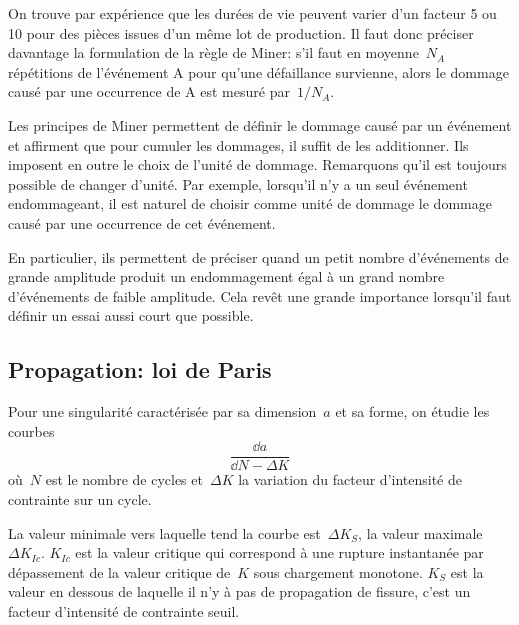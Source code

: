 On trouve par expérience que les durées de vie peuvent varier d'un facteur 5 ou 10 pour des pièces issues d'un même lot de production. Il faut donc préciser davantage la formulation de la règle de Miner: s'il faut en moyenne~$N_A$ répétitions de l'événement A pour qu'une défaillance survienne, alors le dommage causé par une occurrence de A est mesuré par~$1 / N_A$.

\medskip
Les principes de Miner permettent de définir le dommage causé par un événement et affirment que pour cumuler les dommages, il suffit de les additionner. Ils imposent en outre le choix de l'unité de dommage. Remarquons qu'il est toujours possible de changer d'unité. Par exemple, lorsqu'il n'y a un seul événement endommageant, il est naturel de choisir comme unité de dommage le dommage causé par une occurrence de cet événement.

\medskip
{} En particulier, ils permettent de préciser quand un petit nombre d'événements de grande amplitude produit un endommagement égal à un grand nombre d'événements de faible amplitude. Cela revêt une grande importance lorsqu'il faut définir un essai aussi court que possible.


\medskip
\subsection{Propagation: loi de Paris}

\medskip
Pour une singularité caractérisée par sa dimension~$a$ et sa forme, on étudie les courbes
\begin{equation}\frac{\dd a}{\dd N - \Delta K}\end{equation} 
où~$N$ est le nombre de cycles et~$\Delta K$ la variation du facteur d'intensité de contrainte sur un cycle.

\medskip
{} La valeur minimale vers laquelle tend la courbe est~$\Delta K_S$, la valeur maximale~$\Delta K_{Ic}$. $K_{Ic}$ est la valeur critique qui correspond à une rupture instantanée par dépassement de la valeur critique de~$K$ sous chargement monotone. $K_S$ est la valeur en dessous de laquelle il n'y à pas de propagation de fissure, c'est un facteur d'intensité de contrainte seuil.

